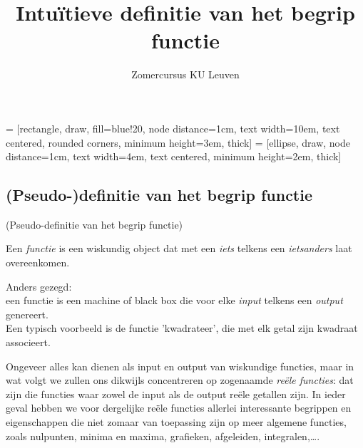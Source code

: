 \documentclass{ximera}
\author{Zomercursus KU Leuven}
\title{Intuïtieve definitie van het begrip functie}
\begin{document}
\begin{abstract}

\end{abstract}
\maketitle  

 = [rectangle, draw, fill=blue!20, node distance=1cm, text width=10em, text centered, rounded corners, minimum height=3em, thick]
 = [ellipse, draw, node distance=1cm, text width=4em, text centered, minimum height=2em, thick]

\subsection{(Pseudo-)definitie van het begrip functie}

\begin{definition} (Pseudo-definitie van het begrip functie)
    
Een  \textit{functie} is een wiskundig object dat met een \textit{iets} telkens een \textit{ietsanders} laat overeenkomen. 
\end{definition}

Anders gezegd: \\
een functie is een machine of black box die voor elke \textit{input} telkens een \textit{output} genereert.
\\

Een typisch voorbeeld is de functie 'kwadrateer', die met elk getal zijn kwadraat associeert.

Ongeveer alles kan dienen als input en output van wiskundige functies, maar in wat volgt we zullen ons dikwijls concentreren op zogenaamde \textit{reële functies}: dat zijn die functies waar zowel de input als de output reële getallen zijn. In ieder geval hebben we voor dergelijke reële functies allerlei interessante begrippen en eigenschappen die niet zomaar van toepassing zijn op meer algemene functies, zoals nulpunten, minima en maxima, grafieken, afgeleiden, integralen,\ldots.

\begin{center}
\end{center}
\end{document}
